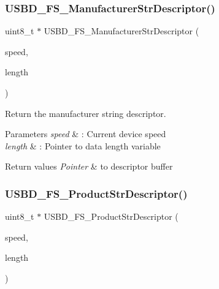 \subsubsection{\texorpdfstring{U\+S\+B\+D\+\_\+\+F\+S\+\_\+\+Manufacturer\+Str\+Descriptor()}{USBD\_FS\_ManufacturerStrDescriptor()}}
{\footnotesize\ttfamily uint8\+\_\+t $\ast$ U\+S\+B\+D\+\_\+\+F\+S\+\_\+\+Manufacturer\+Str\+Descriptor (\begin{DoxyParamCaption}\item[{U\+S\+B\+D\+\_\+\+Speed\+Type\+Def}]{speed,  }\item[{uint16\+\_\+t $\ast$}]{length }\end{DoxyParamCaption})}



Return the manufacturer string descriptor. 


\begin{DoxyParams}{Parameters}
{\em speed} & \+: Current device speed \\
\hline
{\em length} & \+: Pointer to data length variable \\
\hline
\end{DoxyParams}

\begin{DoxyRetVals}{Return values}
{\em Pointer} & to descriptor buffer \\
\hline
\end{DoxyRetVals}
\mbox{\label{group__USBD__DESC__Private__Functions_ga0ec558c0303daabb851d584109a56514}} 
\subsubsection{\texorpdfstring{U\+S\+B\+D\+\_\+\+F\+S\+\_\+\+Product\+Str\+Descriptor()}{USBD\_FS\_ProductStrDescriptor()}}
{\footnotesize\ttfamily uint8\+\_\+t $\ast$ U\+S\+B\+D\+\_\+\+F\+S\+\_\+\+Product\+Str\+Descriptor (\begin{DoxyParamCaption}\item[{U\+S\+B\+D\+\_\+\+Speed\+Type\+Def}]{speed,  }\item[{uint16\+\_\+t $\ast$}]{length }\end{DoxyParamCaption})}



